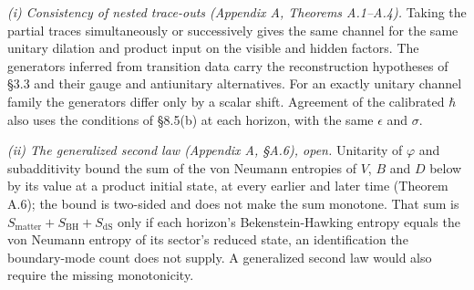 \documentclass[
]{article}
\begin{document}
\emph{(i) Consistency of nested trace-outs (Appendix A, Theorems
A.1--A.4).} Taking the partial traces simultaneously or successively
gives the same channel for the same unitary dilation and product input
on the visible and hidden factors. The generators inferred from
transition data carry the reconstruction hypotheses of §3.3 and their
gauge and antiunitary alternatives. For an exactly unitary channel
family the generators differ only by a scalar shift. Agreement of the
calibrated \(\hbar\) also uses the conditions of §8.5(b) at each
horizon, with the same \(\epsilon\) and \(\sigma\).

\emph{(ii) The generalized second law (Appendix A, §A.6), open.}
Unitarity of \(\varphi\) and subadditivity bound the sum of the von
Neumann entropies of \(V\), \(B\) and \(D\) below by its value at a
product initial state, at every earlier and later time (Theorem A.6);
the bound is two-sided and does not make the sum monotone. That sum is
\(S_{\text{matter}} + S_{\text{BH}} + S_{\text{dS}}\) only if each
horizon's Bekenstein-Hawking entropy equals the von Neumann entropy of
its sector's reduced state, an identification the boundary-mode count
does not supply. A generalized second law would also require the missing
monotonicity.
\end{document}
